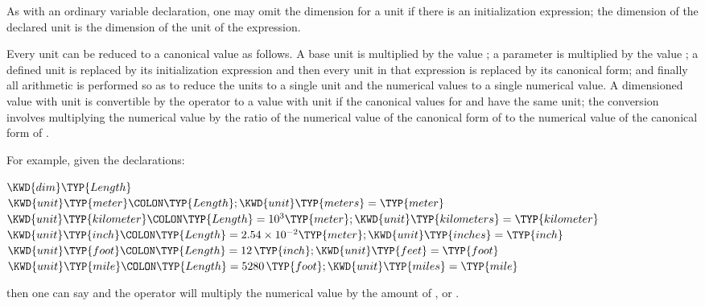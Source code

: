 As with an ordinary variable declaration, one may omit the dimension for a unit
if there is an initialization expression; the dimension of the declared unit is
the dimension of the unit of the expression.


Every unit can be reduced to a canonical value as follows.  A base unit is
multiplied by the value ; a  parameter is multiplied by
the value ; a defined unit is replaced by its initialization
expression and then every unit in that expression is replaced by its
canonical form;
and finally all arithmetic is performed so as to reduce the
units to a single unit and the
numerical values to a single numerical value.  A dimensioned value with unit
 is convertible by the  operator to a value with unit
 if the canonical values for  and  have the same
unit; the conversion involves multiplying the numerical value by the
ratio of the numerical value of the canonical form
of  to the numerical value of the canonical form of .

For example, given the declarations:
\begin{Fortress}
\(\KWD{dim} \TYP{Length}\)\\
\(\KWD{unit} \TYP{meter}\COLON \TYP{Length}; \KWD{unit} \TYP{meters} = \TYP{meter}\)\\
\(\KWD{unit} \TYP{kilometer}\COLON \TYP{Length} = 10^{3} \TYP{meter}; \KWD{unit} \TYP{kilometers} = \TYP{kilometer}\)\\
\(\KWD{unit} \TYP{inch}\COLON \TYP{Length} = 2.54 \times 10^{-2} \TYP{meter}; \KWD{unit} \TYP{inches} = \TYP{inch} \)\\
\(\KWD{unit} \TYP{foot}\COLON \TYP{Length} = 12\,\TYP{inch}; \KWD{unit} \TYP{feet} = \TYP{foot}\)\\
\(\KWD{unit} \TYP{mile}\COLON \TYP{Length} = 5280\,\TYP{foot}; \KWD{unit} \TYP{miles} = \TYP{mile}\)
\end{Fortress}
then one can say  and
the  operator will multiply the numerical value  by
the amount of
,
or .

